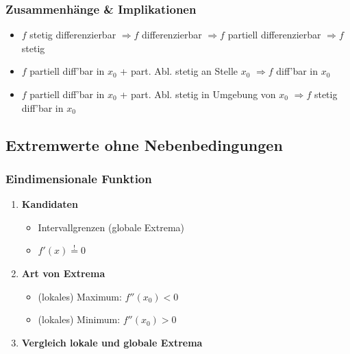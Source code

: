 \documentclass[8pt, a4paper, landscape, fleqn]{scrartcl}
\begin{document}
\begin{multicols*}{3}
				\subsubsection{Zusammenhänge \& Implikationen}
				\begin{itemize}
				    \item $f$ stetig differenzierbar $\Longrightarrow f$ differenzierbar $\Longrightarrow f$ partiell differenzierbar $\Longrightarrow f$ stetig 
				    \item $f$ partiell diff'bar in $x_0$ + part. Abl. stetig an Stelle $x_0$ $\Longrightarrow f$ diff'bar in $x_0$ 
				    \item $f$ partiell diff'bar in $x_0$ + part. Abl. stetig in Umgebung von $x_0$ $\Longrightarrow f$ stetig diff'bar in $x_0$
				\end{itemize}
				
			\subsection{Extremwerte ohne Nebenbedingungen}
				\subsubsection{Eindimensionale Funktion}
					\begin{enumerate}
						\item \textbf{Kandidaten}
							\begin{itemize}
								\item Intervallgrenzen (globale Extrema)
								\item $f'(x) \overset{!}{=}0$
							\end{itemize}
						\item \textbf{Art von Extrema}
							\begin{itemize}
								\item (lokales) Maximum: $f''(x_0)<0$
								\item (lokales) Minimum: $f''(x_0)>0$
							\end{itemize}
						\item \textbf{Vergleich lokale und globale Extrema}
					\end{enumerate}

\end{multicols*}
\end{document}
